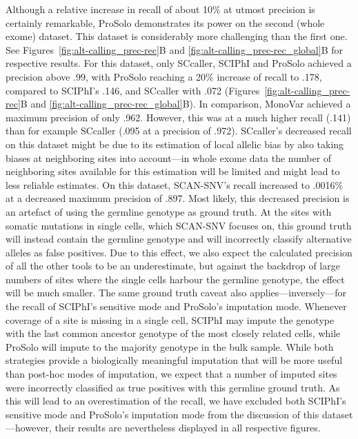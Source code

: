 \documentclass[authoryear,preprint,11pt]{scrartcl}
\begin{document}
Although a relative increase in recall of about 10\% at utmost precision is certainly remarkable, ProSolo demonstrates its power on the second (whole exome) dataset.
This dataset is considerably more challenging than the first one.
See Figures~\ref{fig:alt-calling_prec-rec}B and \ref{fig:alt-calling_prec-rec_global}B for respective results.
For this dataset, only SCcaller, SCIPhI and ProSolo achieved a precision above .99, with ProSolo reaching a 20\% increase of recall to .178, compared to SCIPhI's .146, and SCcaller with .072 (Figures~\ref{fig:alt-calling_prec-rec}B and \ref{fig:alt-calling_prec-rec_global}B).
In comparison, MonoVar achieved a maximum precision of only .962. However, this was at a much higher recall (.141) than for example SCcaller (.095 at a precision of .972).
SCcaller's decreased recall on this dataset might be due to its estimation of local allelic bias by also taking biases at neighboring sites into account---in whole exome data the number of neighboring sites available for this estimation will be limited and might lead to less reliable estimates.
On this dataset, SCAN-SNV's recall increased to .0016\% at a decreased maximum precision of .897.
Most likely, this decreased precision is an artefact of using the germline genotype as ground truth.
At the sites with somatic mutations in single cells, which SCAN-SNV focuses on, this ground truth will instead contain the germline genotype and will incorrectly classify alternative alleles as false positives.
Due to this effect, we also expect the calculated precision of all the other tools to be an underestimate, but against the backdrop of large numbers of sites where the single cells harbour the germline genotype, the effect will be much smaller.
The same ground truth caveat also applies---inversely---for the recall of SCIPhI's sensitive mode and ProSolo's imputation mode.
Whenever coverage of a site is missing in a single cell, SCIPhI may impute the genotype with the last common ancestor genotype of the most closely related cells, while ProSolo will impute to the majority genotype in the bulk sample.
While both strategies provide a biologically meaningful imputation that will be more useful than post-hoc modes of imputation, we expect that a number of imputed sites were incorrectly classified as true positives with this germline ground truth.
As this will lead to an overestimation of the recall, we have excluded both SCIPhI's sensitive mode and ProSolo's imputation mode from the discussion of this dataset---however, their results are nevertheless displayed in all respective figures.
\end{document}
